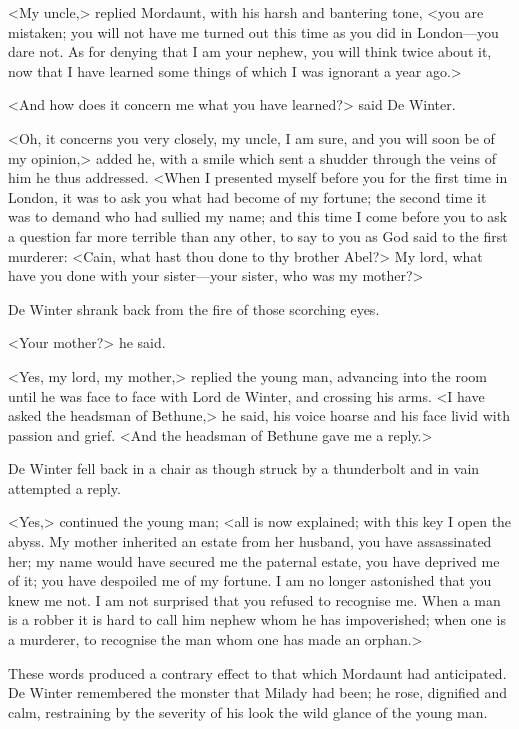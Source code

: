 <My uncle,> replied Mordaunt, with his harsh and bantering tone, <you are mistaken; you will not have me turned out this time as you did in London—you dare not. As for denying that I am your nephew, you will think twice about it, now that I have learned some things of which I was ignorant a year ago.>

<And how does it concern me what you have learned?> said De Winter.

<Oh, it concerns you very closely, my uncle, I am sure, and you will soon be of my opinion,> added he, with a smile which sent a shudder through the veins of him he thus addressed. <When I presented myself before you for the first time in London, it was to ask you what had become of my fortune; the second time it was to demand who had sullied my name; and this time I come before you to ask a question far more terrible than any other, to say to you as God said to the first murderer: <Cain, what hast thou done to thy brother Abel?> My lord, what have you done with your sister—your sister, who was my mother?>

De Winter shrank back from the fire of those scorching eyes.

<Your mother?> he said.

<Yes, my lord, my mother,> replied the young man, advancing into the room until he was face to face with Lord de Winter, and crossing his arms. <I have asked the headsman of Bethune,> he said, his voice hoarse and his face livid with passion and grief. <And the headsman of Bethune gave me a reply.>

De Winter fell back in a chair as though struck by a thunderbolt and in vain attempted a reply.

<Yes,> continued the young man; <all is now explained; with this key I open the abyss. My mother inherited an estate from her husband, you have assassinated her; my name would have secured me the paternal estate, you have deprived me of it; you have despoiled me of my fortune. I am no longer astonished that you knew me not. I am not surprised that you refused to recognise me. When a man is a robber it is hard to call him nephew whom he has impoverished; when one is a murderer, to recognise the man whom one has made an orphan.>

These words produced a contrary effect to that which Mordaunt had anticipated. De Winter remembered the monster that Milady had been; he rose, dignified and calm, restraining by the severity of his look the wild glance of the young man.

